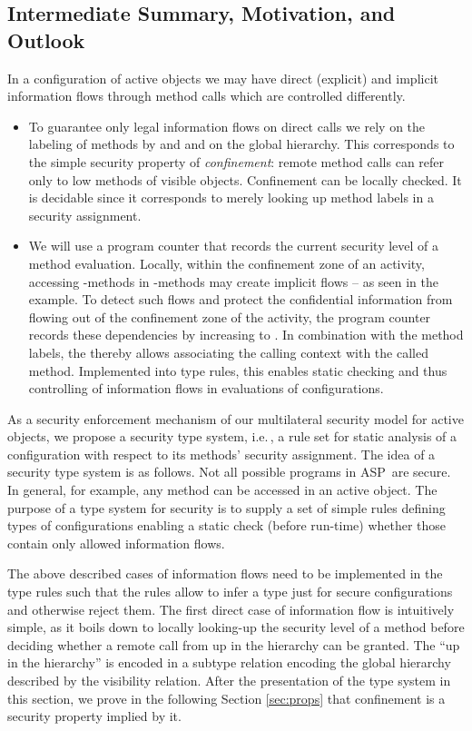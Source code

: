 \documentclass[10pt, conference, compsocconf]{IEEEtran}
\newcommand\aspfun{ASP\ }
\newcommand\ie{i.e.\!\,, }
\begin{document}
{\subsection{Intermediate Summary, Motivation, and Outlook}
\label{sec:typesmotiv}
In a configuration of active objects we may have direct (explicit) and implicit information flows
through method calls which are controlled differently.
\begin{itemize}
\item To guarantee only legal information flows on direct calls we rely on the labeling of
   methods by  and  and on the global hierarchy. This corresponds to the simple security
   property of {\it confinement}: remote method calls can refer only to low methods of visible objects. 
   Confinement can be locally checked. It is decidable since it corresponds to merely looking up 
   method labels in a security assignment. 
\item We will use a program counter  that records the current security level of a method evaluation. 
    Locally, within the confinement zone of an activity, 
accessing -methods in -methods may create implicit flows -- as seen in the example.
    To detect such flows and protect the confidential information from flowing out of the 
    confinement zone of the activity, the program counter records these dependencies by 
    increasing to . In combination with the method labels, the  thereby allows 
    associating the calling context with the called method. Implemented into type rules,
    this enables static checking and thus controlling of information flows in evaluations 
    of configurations. 
\end{itemize}
As a security enforcement mechanism of our multilateral security model for active objects, 
we propose a security type system, \ie a rule set for static analysis of a configuration with respect
to its methods' security assignment. The idea of a security type system is as follows.
Not all possible programs in \aspfun are secure. In general, for example, any method can be accessed
in an active object. The purpose of a type system for security is to supply a set of simple rules defining
types of configurations enabling a static check (before run-time) whether those contain only allowed 
information flows.

The above described cases of information flows need to be implemented in the type rules such that the 
rules allow to infer a type just for secure configurations and otherwise reject them.
The first direct case of information flow is intuitively simple, as it boils down to locally looking-up 
the security level of a method before deciding whether a remote call from up in the hierarchy can be 
granted.
The ``up in the hierarchy'' is encoded in a subtype relation  encoding the global hierarchy
described by the visibility relation. After the presentation of the type system in this section, we 
prove in the following Section \ref{sec:props} that confinement is a security property implied by it.

}
\end{document}
